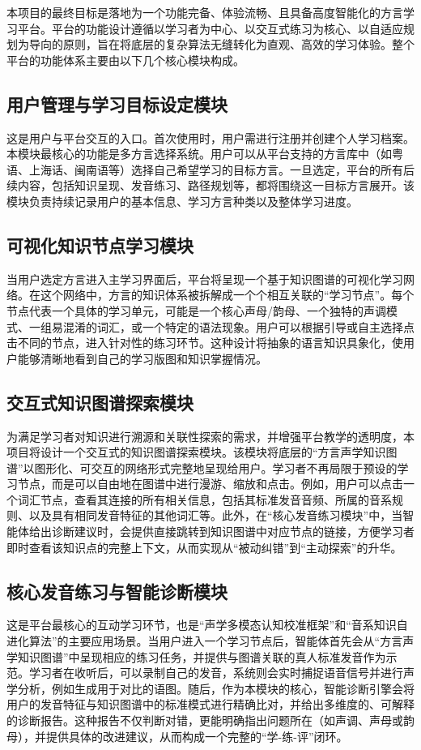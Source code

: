 本项目的最终目标是落地为一个功能完备、体验流畅、且具备高度智能化的方言学习平台。平台的功能设计遵循以学习者为中心、以交互式练习为核心、以自适应规划为导向的原则，旨在将底层的复杂算法无缝转化为直观、高效的学习体验。整个平台的功能体系主要由以下几个核心模块构成。

\subsection{用户管理与学习目标设定模块}
这是用户与平台交互的入口。首次使用时，用户需进行注册并创建个人学习档案。本模块最核心的功能是多方言选择系统。用户可以从平台支持的方言库中（如粤语、上海话、闽南语等）选择自己希望学习的目标方言。一旦选定，平台的所有后续内容，包括知识呈现、发音练习、路径规划等，都将围绕这一目标方言展开。该模块负责持续记录用户的基本信息、学习方言种类以及整体学习进度。

\subsection{可视化知识节点学习模块}
当用户选定方言进入主学习界面后，平台将呈现一个基于知识图谱的可视化学习网络。在这个网络中，方言的知识体系被拆解成一个个相互关联的“学习节点”。每个节点代表一个具体的学习单元，可能是一个核心声母/韵母、一个独特的声调模式、一组易混淆的词汇，或一个特定的语法现象。用户可以根据引导或自主选择点击不同的节点，进入针对性的练习环节。这种设计将抽象的语言知识具象化，使用户能够清晰地看到自己的学习版图和知识掌握情况。

\subsection{交互式知识图谱探索模块}
为满足学习者对知识进行溯源和关联性探索的需求，并增强平台教学的透明度，本项目将设计一个交互式的知识图谱探索模块。该模块将底层的“方言声学知识图谱”以图形化、可交互的网络形式完整地呈现给用户。学习者不再局限于预设的学习节点，而是可以自由地在图谱中进行漫游、缩放和点击。例如，用户可以点击一个词汇节点，查看其连接的所有相关信息，包括其标准发音音频、所属的音系规则、以及具有相同发音特征的其他词汇等。此外，在“核心发音练习模块”中，当智能体给出诊断建议时，会提供直接跳转到知识图谱中对应节点的链接，方便学习者即时查看该知识点的完整上下文，从而实现从“被动纠错”到“主动探索”的升华。

\subsection{核心发音练习与智能诊断模块}
这是平台最核心的互动学习环节，也是“声学多模态认知校准框架”和“音系知识自进化算法”的主要应用场景。当用户进入一个学习节点后，智能体首先会从“方言声学知识图谱”中呈现相应的练习任务，并提供与图谱关联的真人标准发音作为示范。学习者在收听后，可以录制自己的发音，系统则会实时捕捉语音信号并进行声学分析，例如生成用于对比的语图。随后，作为本模块的核心，智能诊断引擎会将用户的发音特征与知识图谱中的标准模式进行精确比对，并给出多维度的、可解释的诊断报告。这种报告不仅判断对错，更能明确指出问题所在（如声调、声母或韵母），并提供具体的改进建议，从而构成一个完整的“学-练-评”闭环。

